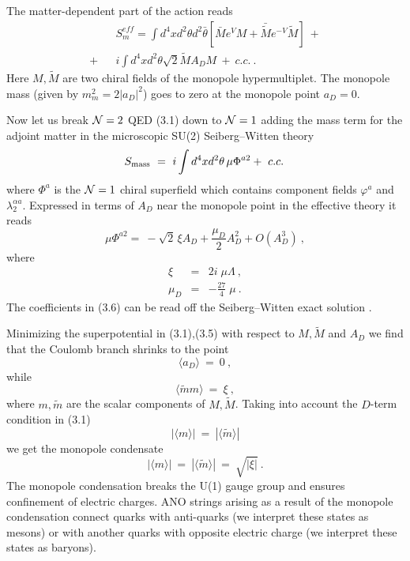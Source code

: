 \documentclass[a4paper,12pt]{article}
\begin{document}
The matter-dependent part of the action reads
\begin{eqnarray}
&& S^{eff}_m=\int d^4xd^2\theta d^2\bar\theta\left[\bar Me^{V}M
+\bar{\tilde M}e^{-V}\tilde M\right]\ + \nonumber\\
+ && i\int d^4xd^2\theta\sqrt2\tilde M A_DM\ +\ c.c.\ .
\end{eqnarray}
Here $M,\tilde M$ are two chiral fields of the monopole hypermultiplet.
The monopole mass (given by $m^2_m=2|a_D|^2$) goes to zero at the
monopole point $a_D=0$.

Now let us break  ${\cal N}=2$ QED (3.1) down to ${\cal N}=1$ adding
 the mass term for the
adjoint matter in the microscopic SU(2) Seiberg--Witten theory 
\begin{equation}
S_{\rm mass}\ =\ i\int d^4xd^2\theta\,\mu \Phi^{a2}+\ c.c.\,
\end{equation}
where $\Phi^a$ is the ${\cal N}=1$ chiral superfield which contains
component fields $\varphi^a$ and $\lambda^{\alpha a}_2$.
 Expressed in
terms of $A_D$  near the monopole point in the effective
theory it reads \cite{SW1}
\begin{equation}
\mu \Phi^{a2}=\ -\sqrt2\,\xi A_D+\frac{\mu_{D}}{2} A^2_D+O(A^3_D)\ ,
\end{equation}
where
\begin{eqnarray}
\xi & = & 2i\; \mu \Lambda\ , \nonumber\\
\mu_{D} & = &  -\frac{27}{4}\; \mu \ .
\end{eqnarray}
The coefficients in (3.6) can be read off the Seiberg--Witten
exact solution \cite{SW1}. 

Minimizing the superpotential in (3.1),(3.5) with respect to
$M,\tilde M$ and $A_D$ we find that the Coulomb branch shrinks
to the point
$$
\langle a_D\rangle\ =\ 0\ ,
$$
while
\begin{equation}
\langle \tilde mm\rangle\ =\ \xi\ ,
\end{equation}
where $m,\tilde m$ are the scalar components of $M,\tilde M$.
Taking into account  the $D$-term condition in (3.1)
\begin{equation}
|\langle m\rangle|\ =\ |\langle\tilde m\rangle|
\end{equation}
we get the monopole condensate
\begin{equation}
|\langle m\rangle|\ =\ |\langle\tilde m\rangle|\ =\ \sqrt{|\xi|}\ .
\end{equation}
The monopole condensation breaks
 the U(1) gauge group and  ensures 
confinement of electric charges. ANO strings arising as a result
of  the monopole condensation connect quarks with anti-quarks (we
interpret these states as mesons) or with another quarks with
opposite electric charge (we interpret these states as
baryons).
\end{document}
